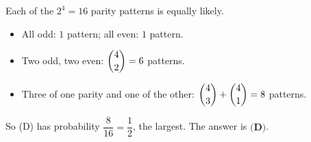 Each of the $2^4=16$ parity patterns is equally likely.
\begin{itemize}
\item All odd: $1$ pattern; all even: $1$ pattern.
\item Two odd, two even: $\dbinom42=6$ patterns.
\item Three of one parity and one of the other: $\dbinom43+\dbinom41=8$ patterns.
\end{itemize}
So (D) has probability $\dfrac{8}{16}=\dfrac12$, the largest. The answer is $\boxed{\textbf{(D)}}$.
